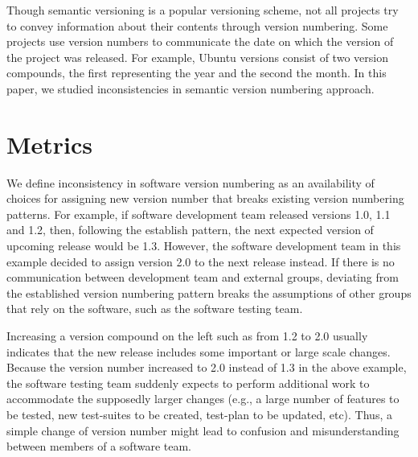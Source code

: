 \documentclass[conference]{IEEEtran}
\begin{document}
Though semantic versioning is a popular versioning scheme, not all projects try to convey information about their contents through version numbering. 
Some projects use version numbers to communicate the date on which the version of the project was released. 
For example, Ubuntu versions consist of two version compounds, the first representing the year and the second the month\cite{UbuntuVersionNumbering}.
In this paper, we studied inconsistencies in semantic version numbering approach.

\section{Metrics}

We define inconsistency in software version numbering as an availability of choices for assigning new version number that breaks existing version numbering patterns. 
For example, if software development team released versions 1.0, 1.1 and 1.2, then, following the establish pattern, the next expected version of upcoming release would be 1.3. 
However,  the software development team in this example decided to assign version 2.0 to the next release instead.
If there is no communication between development team and external groups, deviating from the established version numbering pattern breaks the assumptions of other groups that rely on the software, such as the software testing team.

Increasing a version compound on the left such as from 1.2 to 2.0 usually indicates that the new release includes some important or large scale changes. Because the version number increased to 2.0 instead of 1.3 in the above example,  the software testing team suddenly expects to perform additional work to accommodate the supposedly larger changes (e.g., a large number of features to be tested, new test-suites to be created, test-plan to be updated, etc).
Thus, a simple change of version number might lead to confusion and misunderstanding between members of a software team.
\end{document}
